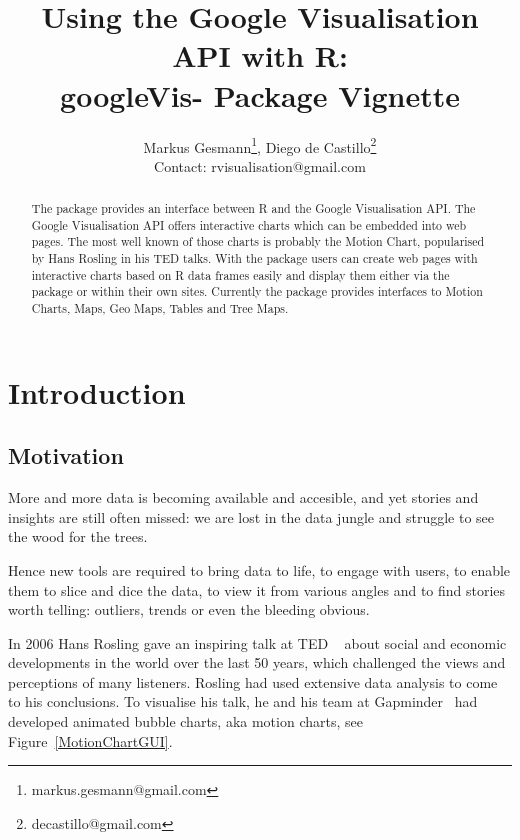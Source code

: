 

\author{Markus Gesmann\footnote{markus.gesmann@gmail.com},
  Diego de Castillo\footnote{decastillo@gmail.com}\\
Contact: rvisualisation@gmail.com}
\title{Using the Google Visualisation API with R:\\
  googleVis- Package Vignette}
\maketitle
\begin{abstract}
  The \googleVis package provides an interface between R and the
  Google Visualisation API.  The Google Visualisation API offers
  interactive charts which can be embedded into web pages. The most
  well known of those charts is probably the Motion Chart, popularised
  by Hans Rosling in his TED talks.  With the \googleVis package users
  can create web pages with  interactive charts based on R data frames
  easily and display them either via the \rsp package or
  within their own sites. Currently the package provides interfaces to
  Motion Charts, Maps, Geo Maps, Tables and Tree Maps. 
\end{abstract}

\clearpage
\tableofcontents
\clearpage

\section{Introduction}

\subsection{Motivation}
More and more data is becoming available and accesible, and yet
stories and insights are still often missed: we are lost in the data
jungle and struggle to see the wood for the trees. 

Hence new tools are required to bring data to life, to engage with
users, to enable them to slice and dice the data, to view it from
various angles and to find stories worth telling: outliers, trends or
even the bleeding obvious.

In 2006 Hans Rosling gave an inspiring talk at TED
~\cite{HansRoslingTedTalk} about social and economic developments in
the world over the last 50 years, which challenged the views and
perceptions of many listeners. Rosling had used extensive data analysis
to come to his conclusions.  To visualise his talk, he and his team at
Gapminder~\cite{Gapminder} had developed animated bubble charts, aka
motion charts, see Figure~\ref{MotionChartGUI}. 

